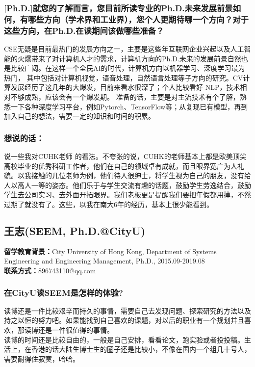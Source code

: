 \documentclass[a4paper,UTF8]{book}
\begin{document}
    \subsubsection*{[Ph.D.]就您的了解而言，您目前所读专业的Ph.D.未来发展前景如何，有哪些方向（学术界和工业界），您个人更期待哪一个方向？对于这些方向，在Ph.D.在读期间该做哪些准备？}
    CSE无疑是目前最热门的发展方向之一，主要是这些年互联网企业兴起以及人工智能的火爆带来了对计算机人才的需求，计算机方向的Ph.D.未来的发展前景自然也是比较广阔。在这样一个全民AI的时代，计算机方向以机器学习、深度学习最为热门， 其中包括对计算机视觉，语音处理，自然语言处理等子方向的研究。CV计算发展经历了这几年的大爆发，目前来看水很深了；个人比较看好 NLP，技术相对不够成熟，应该会有一个爆发期。
    准备的话，主要是对主流技术有个了解，熟悉一下各种深度学习平台，例如Pytorch、TensorFlow等；从复现已有模型，再到加入自己的想法，需要一定的知识和时间的积累。
    
    \subsubsection{想说的话：}
    说一些我对CUHK老师 的看法。不夸张的说，CUHK的老师基本上都是欧美顶尖高校毕业的优秀科研工作者，他们在自己的领域卓有成就，而且眼界宽广为人礼貌。以我接触的几位老师为例，他们待人很绅士，将学生视为自己的朋友，没有给人以高人一等的姿态。他们乐于与学生交流有趣的话题，鼓励学生劳逸结合，鼓励学生去公司实习、去外面开拓眼界。我们老板更是提醒我们要把年假都用掉，不然过期了就没有了。这些，以我在南大6年的经历，基本上很少能看到。



\clearpage
\subsection{王志(SEEM, Ph.D.@CityU)}
    \textbf{留学教育背景：}City University of Hong Kong, Department of Systems Engineering and Engineering Management, Ph.D., 2015.09-2019.08\\
    \textbf{联系方式：}896743110@qq.com

    \subsubsection*{在CityU读SEEM是怎样的体验?}
    读博还是一件比较艰辛而持久的事情，需要自己去发现问题、探索研究的方法以及持之以恒的努力吧。如果能找到自己喜欢的课题，对以后的职业有一个规划并且喜欢，那读博还是一件很值得的事情。\\
    读博的时间还是比较自由的，一般是自己安排，看看论文，跑实验或者投投稿。生活上，在香港的话大陆生博士生的圈子还是比较小，不像在国内一个组几十号人，需要耐得住寂寞，哈哈。
    
\end{document}
